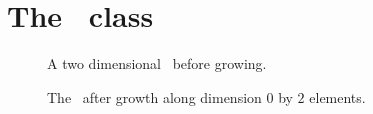\section{The \nxfield\ class}
\begin{figure}[tb]
\centering
\begin{minipage}[t]{0.25\linewidth}
\centering
{}
\caption{{\small\label{fig:array}A two dimensional \nxfield\ before growing. }}
\end{minipage}
\hspace{0.01\linewidth}
\begin{minipage}[t]{0.3\linewidth}
\centering
{}
\caption{{\small\label{fig:array_grow}The \nxfield\ after growth along dimension
$0$ by $2$ elements.}}
\end{minipage}
\hspace{0.01\linewidth}
\begin{minipage}[t]{0.36\linewidth}
\centering
{}

\end{minipage}
\end{figure}
